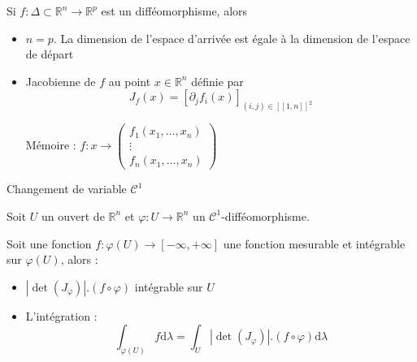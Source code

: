 \begin{Prop}{}{}
Si $f : \Delta \subset \mathbb{R} ^{n} \to \mathbb{R} ^{p}$ est un difféomorphisme, alors 
\begin{itemize}

    \item $n=p$. La dimension de l'espace d'arrivée est égale à la dimension de l'espace de départ

    \item Jacobienne de $f$ au point $x \in \mathbb{R} ^{n}$ définie par 
      \begin{equation}
        J_f(x) = [\partial_j f_i(x)] _{(i,j) \in [\![1,n ]\!] ^{2}}
      \end{equation}

      Mémoire : $f : x \to \begin{pmatrix}
        f_1(x_1, \dots, x_n) \\ 
        \vdots \\
        f_n(x_1, \dots, x_n)
      \end{pmatrix}$

\end{itemize}
\end{Prop}

\begin{Theorem}{Changement de variable $\mathscr{C} ^{1}$}{}

Soit $U$ un ouvert de $\mathbb{R} ^{n}$ et $\varphi : U \to \mathbb{R} ^{n}$ un $\mathscr{C} ^{1}$-difféomorphisme. 

Soit une fonction $f: \varphi(U) \to [-\infty, +\infty]$ une fonction mesurable et intégrable sur $\varphi(U)$, alors : 
\begin{itemize}

    \item $|\det(J _{\varphi})| .(f \circ \varphi)$ intégrable sur $U$ 
    \item L'intégration : 
      \begin{equation}
        \int_{\varphi(U)}^{} f \mathrm{d} \lambda = \int_{U}^{}| \det(J _{\varphi}) | . (f \circ \varphi) \mathrm{d}  \lambda
      \end{equation}

\end{itemize}
\end{Theorem}









